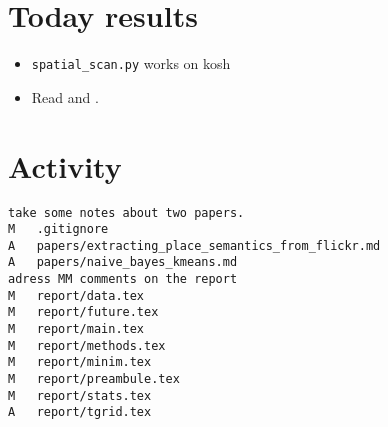 \section*{Today results}
\begin{itemize}
	\item \texttt{spatial\_scan.py} works on kosh
	\item Read \cite{Rattenbury2009} and \cite{VanLaere2010}.
\end{itemize}
\section*{Activity}
\begin{verbatim}
take some notes about two papers.
M	.gitignore
A	papers/extracting_place_semantics_from_flickr.md
A	papers/naive_bayes_kmeans.md
adress MM comments on the report
M	report/data.tex
M	report/future.tex
M	report/main.tex
M	report/methods.tex
M	report/minim.tex
M	report/preambule.tex
M	report/stats.tex
A	report/tgrid.tex
\end{verbatim}